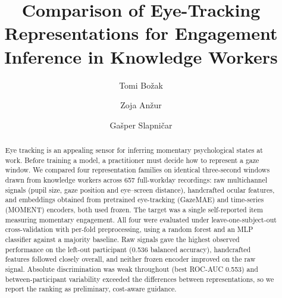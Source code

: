 \documentclass[sigconf,natbib=false,language=english]{acmart}
\begin{document}
\title[Eye-Tracking Representations for Engagement]{Comparison of Eye-Tracking Representations for Engagement Inference in Knowledge Workers}

\author{Tomi Bo\v{z}ak}

\author{Zoja An\v{z}ur}

\author{Ga\v{s}per Slapni\v{c}ar}

\renewcommand{\shortauthors}{Bo\v{z}ak, An\v{z}ur, and Slapni\v{c}ar}

\begin{abstract}
	Eye tracking is an appealing sensor for inferring momentary psychological states at work.
	Before training a model, a practitioner must decide how to represent a gaze window.
	We compared four representation families on identical three-second windows drawn from knowledge workers across 657 full-workday recordings: raw multichannel signals (pupil size, gaze position and eye--screen distance), handcrafted ocular features, and embeddings obtained from pretrained eye-tracking (GazeMAE) and time-series (MOMENT) encoders, both used frozen.
	The target was a single self-reported item measuring momentary engagement.
	All four were evaluated under leave-one-subject-out cross-validation with per-fold preprocessing, using a random forest and an MLP classifier against a majority baseline.
	Raw signals gave the highest observed performance on the left-out participant (0.536 balanced accuracy), handcrafted features followed closely overall, and neither frozen encoder improved on the raw signal.
	Absolute discrimination was weak throughout (best ROC-AUC 0.553) and between-participant variability exceeded the differences between representations, so we report the ranking as preliminary, cost-aware guidance.
\end{abstract}


\maketitle
\end{document}
